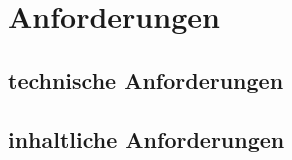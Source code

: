 \section{Anforderungen}

\subsection{technische Anforderungen}

\subsection{inhaltliche Anforderungen}
